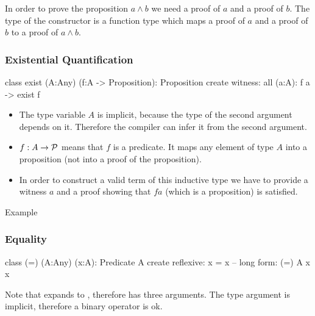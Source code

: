 In order to prove the proposition $a \land b$ we need a proof of $a$ and a
proof of $b$. The type of the constructor is a function type which maps a
proof of $a$ and a proof of $b$ to a proof of $a \land b$.
\newline





\subsubsection{Existential Quantification}

\begin{alba}
  class
     exist (A:Any) (f:A -> Proposition): Proposition
  create
     witness: all (a:A): f a -> exist f
\end{alba}

\begin{itemize}
\item The type variable $A$ is implicit, because the type of the second
  argument depends on it. Therefore the compiler can infer it from the second
  argument.

\item $f:A\to {\cal{P}}$ means that $f$ is a predicate. It maps any element of
  type $A$ into a proposition (not into a proof of the proposition).

\item In order to construct a valid term of this inductive type we have to
  provide a witness $a$ and a proof showing that $f a$ (which is a
  proposition) is satisfied.
\end{itemize}

Example
\vskip 2mm


\subsubsection{Equality}
\label{sec:equality}

\begin{alba}
  class
    (=) (A:Any) (x:A): Predicate A
  create
    reflexive: x = x    -- long form: (=) A x x
\end{alba}

Note that  expands to , therefore
\code{(=)} has three arguments. The type argument is implicit, therefore a
binary operator is ok.
\vskip 2mm


